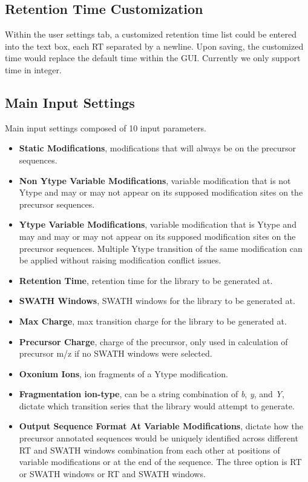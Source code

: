 \documentclass[../manual.tex]{subfiles}
\begin{document}
\subsection{Retention Time Customization}
Within the user settings tab, a customized retention time list could be entered into the text box, each RT separated by a newline. Upon saving, the customized time would replace the default time within the GUI. Currently we only support time in integer.

\subsection{Main Input Settings}
Main input settings composed of 10 input parameters.\par

\begin{itemize}
	\item \textbf{Static Modifications}, modifications that will always be on the precursor sequences.
	\item \textbf{Non Ytype Variable Modifications}, variable modification that is not Ytype and may or may not appear on its supposed modification sites on the precursor sequences.
	\item \textbf{Ytype Variable Modifications}, variable modification that is Ytype and may and may or may not appear on its supposed modification sites on the precursor sequences. Multiple Ytype transition of the same modification can be applied without raising modification conflict issues.
	\item \textbf{Retention Time}, retention time for the library to be generated at.
	\item \textbf{SWATH Windows}, SWATH windows for the library to be generated at.
	\item \textbf{Max Charge}, max transition charge for the library to be generated at.
	\item \textbf{Precursor Charge}, charge of the precursor, only used in calculation of precursor m/z if no SWATH windows were selected.
	\item \textbf{Oxonium Ions}, ion fragments of a Ytype modification.
	\item \textbf{Fragmentation ion-type}, can be a string combination of \emph{b}, \emph{y}, and \emph{Y}, dictate which transition series that the library would attempt to generate.
	\item \textbf{Output Sequence Format At Variable Modifications}, dictate how the precursor annotated sequences would be uniquely identified across different RT and SWATH windows combination from each other at positions of variable modifications or at the end of the sequence. The three option is RT or SWATH windows or RT and SWATH windows.
\end{itemize}
\end{document}

